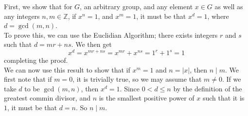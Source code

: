 \documentclass[12pt]{article}
\newcommand{\Z}{\mathbb{Z}}
\begin{document}
    First, we show that for $G$, an arbitrary group,
    and any element $x \in G$ as well as any integers $n, m \in \Z$,
    if $x^n = 1$,
    and $x^m = 1$,
    it must be that $x^d = 1$,
    where $d = \gcd(m, n)$. \\ 
    To prove this, we can use the Euclidian Algorithm;
    there exists integers $r$ and $s$ such that $d = mr + ns$.
    We then get
    \[ x^d = x^{mr + ns} = x^{mr} + x^{ns} = 1^r + 1^s = 1 \]
    completing the proof. \\

    We can now use this result to show that
    if $x^m = 1$ and $n = |x|$, then $n \mid m$.
    We first note that if $m = 0$, it is trivially true,
    so we may assume that $m \neq 0$. 
    If we take $d$ to be $\gcd(m, n)$,
    then $x^d = 1$.
    Since $0 < d \leqslant n$
    by the definition of the greatest commin divisor,
    and $n$ is the smallest positive power of $x$ such that it is $1$,
    it must be that $d = n$. So $n \mid m$. \\
    
\end{document}
